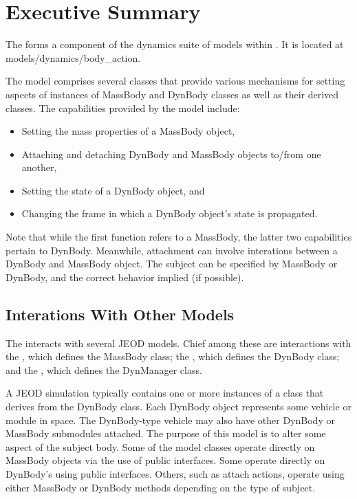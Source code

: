 %

\chapter*{Executive Summary}

The \ModelDesc forms a component of the dynamics suite of
models within \JEODid. It is located at
models/dynamics/body\_action.

The model comprises several classes that provide various mechanisms
for setting aspects of instances of MassBody and DynBody classes as well as
their derived classes.
The capabilities provided by the model include:
\begin{itemize}
\item Setting the mass properties of a MassBody object,
\item Attaching and detaching DynBody and MassBody objects to/from one another,
\item Setting the state of a DynBody object, and
\item Changing the frame in which a DynBody object's state is propagated.
\end{itemize}

Note that while the first function refers to a MassBody, the latter two
capabilities pertain to DynBody. Meanwhile, attachment can involve
interations between a DynBody and MassBody object.
 The subject can be specified by MassBody or DynBody, and the correct behavior
 implied (if possible).

\section*{Interations With Other Models}
The \ModelDesc interacts with several JEOD models. Chief among these
are interactions with
the ,
which defines the MassBody class;
the ,
which defines the DynBody class; and
the ,
which defines the DynManager class.

A JEOD simulation typically contains one or more instances of a
class that derives from the DynBody class.
Each DynBody object represents some vehicle or module in space.
The DynBody-type vehicle may also have other DynBody or MassBody submodules
attached. The purpose of this model is to alter some aspect of the subject body.
Some of the model classes operate directly on MassBody objects
via the use of public interfaces. Some operate directly on DynBody's using
public interfaces. Others, such as attach actions, operate using either
MassBody or DynBody methods depending on the type of subject.

